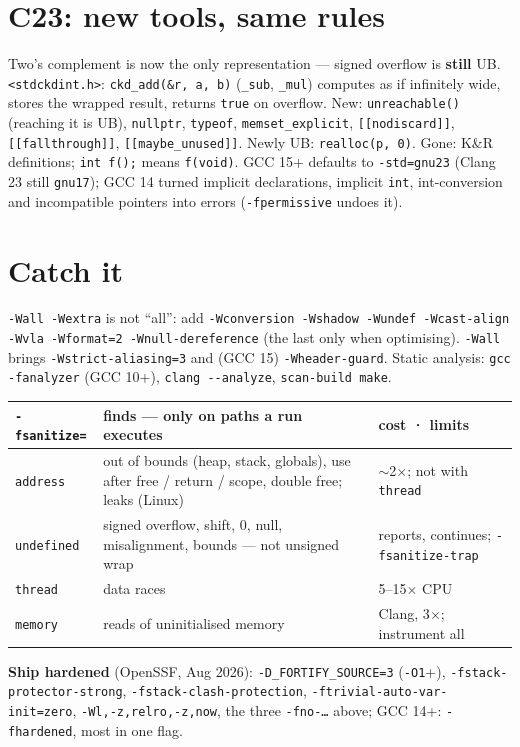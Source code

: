 \documentclass[8pt]{extarticle}
\newcommand\ct[1]{\texttt{#1}}
\begin{document}
\begin{multicols}{2}
\section{C23: new tools, same rules}
Two's complement is now the only representation — signed overflow is \textbf{still} UB.
\ct{<stdckdint.h>}: \ct{ckd\_add(\&r, a, b)} (\ct{\_sub}, \ct{\_mul}) computes as if infinitely
wide, stores the wrapped result, returns \ct{true} on overflow. New: \ct{unreachable()} (reaching
it is UB), \ct{nullptr}, \ct{typeof}, \ct{memset\_explicit}, \ct{[[nodiscard]]},
\ct{[[fallthrough]]}, \ct{[[maybe\_unused]]}. Newly UB: \ct{realloc(p, 0)}. Gone: K\&R
definitions; \ct{int f();} means \ct{f(void)}. GCC 15+ defaults to \ct{-std=gnu23} (Clang 23 still
\ct{gnu17}); GCC 14 turned implicit declarations, implicit \ct{int}, int-conversion and
incompatible pointers into errors (\ct{-fpermissive} undoes it).

\columnbreak

\section{Catch it}
\ct{-Wall -Wextra} is not ``all'': add \ct{-Wconversion -Wshadow -Wundef -Wcast-align -Wvla
-Wformat=2 -Wnull-dereference} (the last only when optimising). \ct{-Wall} brings
\ct{-Wstrict-aliasing=3} and (GCC 15) \ct{-Wheader-guard}. Static analysis: \ct{gcc -fanalyzer}
(GCC 10+), \ct{clang -{}-analyze}, \ct{scan-build make}.

{\scriptsize\setlength{\tabcolsep}{2pt}
\begin{tabular}{@{}L{12mm}L{42mm}L{22mm}@{}}
\toprule
\ct{-fsanitize=} & \textbf{finds — only on paths a run executes} & \textbf{cost · limits}\\ \midrule
\ct{address} & out of bounds (heap, stack, globals), use after free / return / scope, double free; leaks (Linux) & $\sim$2$\times$; not with \ct{thread}\\
\ct{undefined} & signed overflow, shift, \pdfonly{$\div$}0, null, misalignment, bounds — not unsigned wrap & reports, continues; \ct{-fsanitize-trap}\\
\ct{thread} & data races & 5–15$\times$ CPU\\
\ct{memory} & reads of uninitialised memory & Clang, 3$\times$; instrument all\\
\bottomrule
\end{tabular}}\par
\textbf{Ship hardened} (OpenSSF, Aug 2026): \ct{-D\_FORTIFY\_SOURCE=3} (\ct{-O1}+),
\ct{-fstack-protector-strong}, \ct{-fstack-clash-protection}, \ct{-ftrivial-auto-var-init=zero},
\ct{-Wl,-z,relro,-z,now}, the three \ct{-fno-…} above; GCC 14+: \ct{-fhardened}, most in one flag.


\end{multicols}
\end{document}
